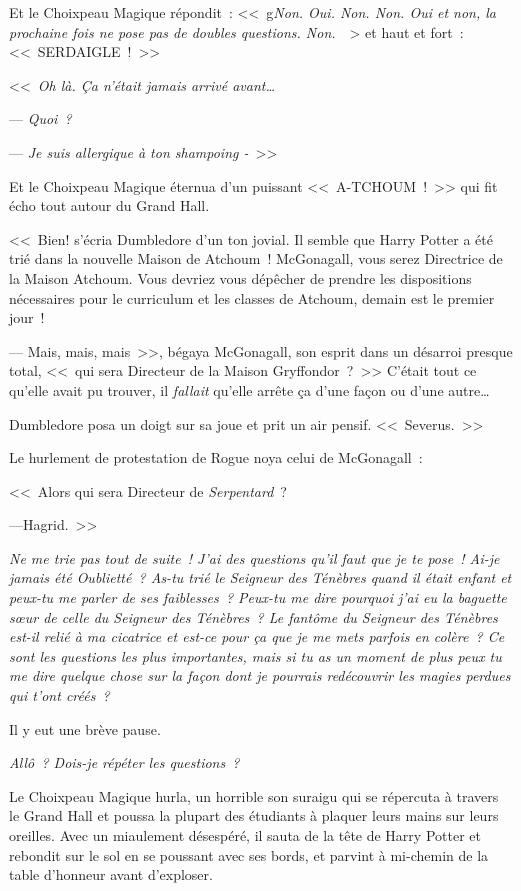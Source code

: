 Et le Choixpeau Magique répondit~: <<~g\emph{Non. Oui. Non. Non. Oui et non, la prochaine fois ne pose pas de doubles questions. Non.}~~> et haut et fort~: <<~SERDAIGLE~!~>>

\later

<<~\emph{Oh là. Ça n'était jamais arrivé avant…}

--- \emph{Quoi~?}

--- \emph{Je suis allergique à ton shampoing -}~>>

Et le Choixpeau Magique éternua d'un puissant <<~A-TCHOUM~!~>> qui fit écho tout autour du Grand Hall.

<<~Bien! s'écria Dumbledore d'un ton jovial. Il semble que Harry Potter a été trié dans la nouvelle Maison de Atchoum~! McGonagall, vous serez Directrice de la Maison Atchoum. Vous devriez vous dépêcher de prendre les dispositions nécessaires pour le curriculum et les classes de Atchoum, demain est le premier jour~!

--- Mais, mais, mais~>>, bégaya McGonagall, son esprit dans un désarroi presque total, <<~qui sera Directeur de la Maison Gryffondor~?~>> C'était tout ce qu'elle avait pu trouver, il \emph{fallait} qu'elle arrête ça d'une façon ou d'une autre…

Dumbledore posa un doigt sur sa joue et prit un air pensif. <<~Severus.~>>

Le hurlement de protestation de Rogue noya celui de McGonagall~:

<<~Alors qui sera Directeur de \emph{Serpentard}~?

---Hagrid.~>>

\later

\emph{Ne me trie pas tout de suite~! J'ai des questions qu'il faut que je te pose~! Ai-je jamais été Oublietté~? As-tu trié le Seigneur des Ténèbres quand il était enfant et peux-tu me parler de ses faiblesses~? Peux-tu me dire pourquoi j'ai eu la baguette sœur de celle du Seigneur des Ténèbres~? Le fantôme du Seigneur des Ténèbres est-il relié à ma cicatrice et est-ce pour ça que je me mets parfois en colère~? Ce sont les questions les plus importantes, mais si tu as un moment de plus peux tu me dire quelque chose sur la façon dont je pourrais redécouvrir les magies perdues qui t'ont créés~?}

Il y eut une brève pause.

\emph{Allô~? Dois-je répéter les questions~?}

Le Choixpeau Magique hurla, un horrible son suraigu qui se répercuta à travers le Grand Hall et poussa la plupart des étudiants à plaquer leurs mains sur leurs oreilles. Avec un miaulement désespéré, il sauta de la tête de Harry Potter et rebondit sur le sol en se poussant avec ses bords, et parvint à mi-chemin de la table d'honneur avant d'exploser.

